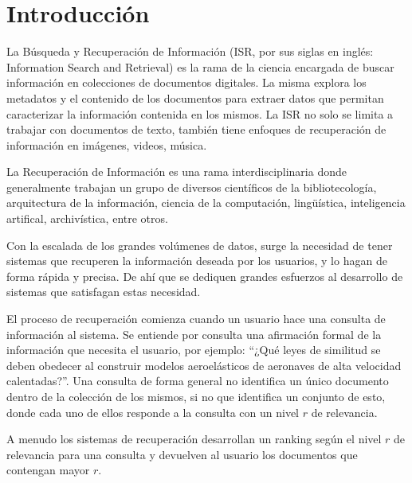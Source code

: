 \section{Introducción}

La Búsqueda y Recuperación de Información (ISR, por sus siglas en inglés: Information Search and Retrieval) es la rama de la ciencia encargada de buscar información en colecciones de documentos digitales. La misma explora los metadatos y el contenido de los documentos para extraer datos que permitan caracterizar la información contenida en los mismos. La ISR no solo se limita a trabajar con documentos de texto, también tiene enfoques de recuperación de información en imágenes, videos, música. \cite{mri} 

La Recuperación de Información es una rama interdisciplinaria donde generalmente trabajan un grupo de diversos científicos de la bibliotecología, arquitectura de la información, ciencia de la computación, lingüística, inteligencia artifical, archivística, entre otros.

Con la escalada de los grandes volúmenes de datos, surge la necesidad de tener sistemas que recuperen la información deseada por los usuarios, y lo hagan de forma rápida y precisa. De ahí que se dediquen grandes esfuerzos al desarrollo de sistemas que satisfagan estas necesidad.

El proceso de recuperación comienza cuando un usuario hace una consulta de información al sistema. Se entiende por consulta una afirmación formal de la información que necesita el usuario, por ejemplo: ``¿Qué leyes de similitud se deben obedecer al construir modelos aeroelásticos de aeronaves de alta velocidad calentadas?''. Una consulta de forma general no identifica un único documento dentro de la colección de los mismos, si no que identifica un conjunto de esto, donde cada uno de ellos responde a la consulta con un nivel $r$ de relevancia. 

A menudo los sistemas de recuperación desarrollan un ranking según el nivel $r$ de relevancia para una consulta y devuelven al usuario los documentos que contengan mayor $r$.